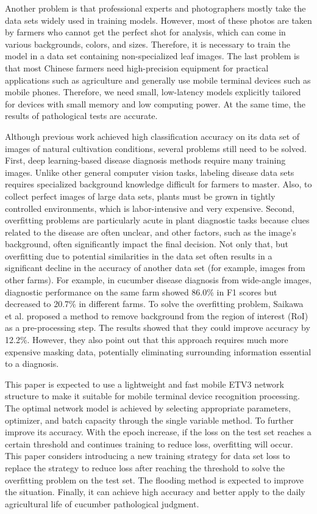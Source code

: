 \documentclass[a4paper,fleqn]{cas-sc}
\begin{document}
Another problem is that professional experts and photographers mostly take the data sets widely used in training models. However, most of these photos are taken by farmers who cannot get the perfect shot for analysis, which can come in various backgrounds, colors, and sizes. Therefore, it is necessary to train the model in a data set containing non-specialized leaf images. The last problem is that most Chinese farmers need high-precision equipment for practical applications such as agriculture and generally use mobile terminal devices such as mobile phones. Therefore, we need small, low-latency models explicitly tailored for devices with small memory and low computing power. At the same time, the results of pathological tests are accurate. 

Although previous work achieved high classification accuracy on its data set of images of natural cultivation conditions, several problems still need to be solved. First, deep learning-based disease diagnosis methods require many training images. Unlike other general computer vision tasks, labeling disease data sets requires specialized background knowledge difficult for farmers to master. Also, to collect perfect images of large data sets, plants must be grown in tightly controlled environments, which is labor-intensive and very expensive. Second, overfitting problems are particularly acute in plant diagnostic tasks because clues related to the disease are often unclear, and other factors, such as the image's background, often significantly impact the final decision. Not only that, but overfitting due to potential similarities in the data set often results in a significant decline in the accuracy of another data set (for example, images from other farms). For example, in cucumber disease diagnosis from wide-angle images, diagnostic performance on the same farm showed 86.0\% in F1 scores but decreased to 20.7\% in different farms. To solve the overfitting problem, Saikawa et al. \cite{saikawa2019aop} proposed a method to remove background from the region of interest (RoI) as a pre-processing step. The results showed that they could improve accuracy by 12.2\%. However, they also point out that this approach requires much more expensive masking data, potentially eliminating surrounding information essential to a diagnosis. \cite{cap2020leafgan}

This paper is expected to use a lightweight and fast mobile ETV3 network structure to make it suitable for mobile terminal device recognition processing. The optimal network model is achieved by selecting appropriate parameters, optimizer, and batch capacity through the single variable method. To further improve its accuracy. With the epoch increase, if the loss on the test set reaches a certain threshold and continues training to reduce loss, overfitting will occur. This paper considers introducing a new training strategy for data set loss to replace the strategy to reduce loss after reaching the threshold to solve the overfitting problem on the test set. The flooding method is expected to improve the situation. Finally, it can achieve high accuracy and better apply to the daily agricultural life of cucumber pathological judgment.
\end{document}
